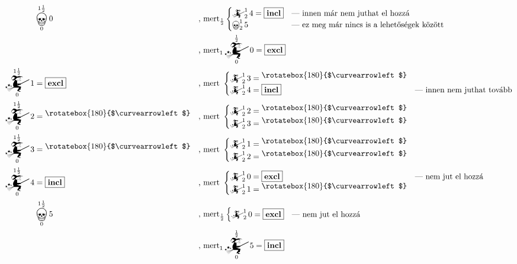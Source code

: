 \documentclass{article}
\newcommand{\nothing}{\text{\raisebox{0.4em}{\rotatebox{180}{$\curvearrowleft$}}}}%
\newcommand{\just}[1]{\boxed{#1}}%
\newcommand{\incl}{\mathbf{incl}}
\newcommand{\excl}{\mathbf{excl}}
\newcommand{\mainfun}[3]{\mathwitch_{#1}^{#2}#3}
\newcommand{\nomainfun}[3]{\bigskull_{#1}^{#2}#3}
\newcommand{\storm}{\mathcloud\mspace{-42mu}\lightning\mspace{3mu}\lightning\mspace{20mu}}
\begin{document}
	\begin{align*}
		&\nomainfun0{1\frac12}0              &&\text{, mert}_{\frac12}\begin{cases}\mainfun214 = \just\incl&\text{--- innen már nem juthat el hozzá}\\\nomainfun215&\text{--- ez meg már nincs is a lehetőségek között}\end{cases} \\
		&                                    &&\text{, mert}_1\mainfun0{\frac12}0 = \just\excl\\
		\mainfun0{1\frac12}1  &= \just\excl  &&\text{, mert }\begin{cases}\mainfun213 = \nothing\\\mainfun214 = \just\incl&\text{--- innen nem juthat tovább}\end{cases} \\
		\mainfun0{1\frac12}2  &= \nothing    &&\text{, mert }\begin{cases}\mainfun212 = \nothing\\\mainfun213 = \nothing&\end{cases} \\
		\mainfun0{1\frac12}3  &= \nothing    &&\text{, mert }\begin{cases}\mainfun211 = \nothing\\\mainfun212 = \nothing&\end{cases} \\
		\mainfun0{1\frac12}4  &= \just\incl  &&\text{, mert }\begin{cases}\mainfun210 = \just\excl&\text{--- nem jut el hozzá}\\\mainfun211 = \nothing&\end{cases} \\%
		&\nomainfun0{1\frac12}5              &&\text{, mert}_{\frac12}\begin{cases}\mainfun210 = \just\excl&\text{--- nem jut el hozzá}\end{cases}\\
		&                                    &&\text{, mert}_1 \mainfun0{\frac12}5 = \just\incl
	\end{align*}
\end{document}
